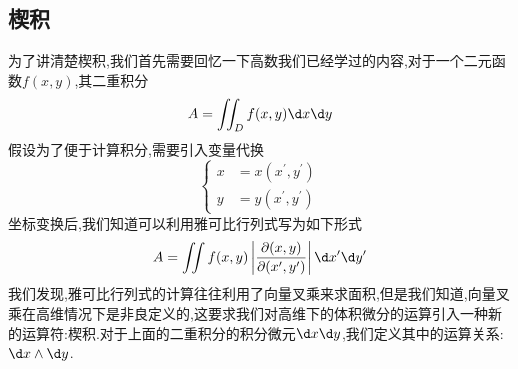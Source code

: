 \subsection{楔积}
为了讲清楚楔积,我们首先需要回忆一下高数我们已经学过的内容,对于一个二元函数$f(x,y)$,其二重积分
\begin{equation}
    A=\iint_Df(x,y)\dx\dy
\end{equation}
假设为了便于计算积分,需要引入变量代换
\begin{equation}
    \begin{cases}x&=x(x^{\prime},y^{\prime})\\y&=y(x^{\prime},y^{\prime})\end{cases}
\end{equation}
坐标变换后,我们知道可以利用雅可比行列式写为如下形式
\begin{equation}
    A=\iint f(x,y)\left|\frac{\partial(x,y)}{\partial(x^{\prime},y^{\prime})}\right|\dx^{\prime}\dy^{\prime}
\end{equation}
我们发现,雅可比行列式的计算往往利用了向量叉乘来求面积,但是我们知道,向量叉乘在高维情况下是非良定义的,这要求我们对高维下的体积微分的运算引入一种新的运算符:楔积.对于上面的二重积分的积分微元$\dx\dy$,我们定义其中的运算关系:$\dx\wedge\dy$.

